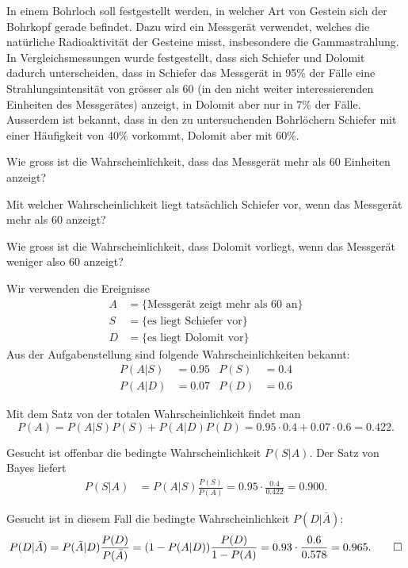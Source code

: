 In einem Bohrloch soll festgestellt werden, in welcher Art von Gestein
sich der Bohrkopf gerade befindet. Dazu wird ein Messgerät verwendet, welches
die natürliche Radioaktivität der Gesteine misst, insbesondere die
Gammastrahlung.
In Vergleichsmessungen wurde festgestellt, dass sich Schiefer
und Dolomit dadurch unterscheiden, dass in Schiefer das Messgerät
in 95\% der Fälle eine Strahlungsintensität von grösser als 60 (in den
nicht weiter interessierenden Einheiten des Messgerätes) anzeigt,
in Dolomit aber nur in 7\% der Fälle.
Ausserdem ist bekannt, dass in den zu untersuchenden Bohrlöchern
Schiefer mit einer Häufigkeit von 40\% vorkommt, Dolomit aber mit 60\%.
\begin{teilaufgaben}
\item
Wie gross ist die Wahrscheinlichkeit, dass das Messgerät mehr als 60
Einheiten anzeigt?
\item
Mit welcher Wahrscheinlichkeit liegt tatsächlich Schiefer vor, wenn 
das Messgerät mehr als 60 anzeigt?
\item
Wie gross ist die Wahrscheinlichkeit, dass Dolomit vorliegt, wenn
das Messgerät weniger also 60 anzeigt?
\end{teilaufgaben}


\begin{loesung}
Wir verwenden die Ereignisse
\begin{align*}
A&=\{\text{Messgerät zeigt mehr als 60 an}\}\\
S&=\{\text{es liegt Schiefer vor}\}\\
D&=\{\text{es liegt Dolomit vor}\}
\end{align*}
Aus der Aufgabenstellung sind folgende Wahrscheinlichkeiten bekannt:
\begin{align*}
P(A|S)&=0.95&
P(S)&=0.4\\
P(A|D)&=0.07&
P(D)&=0.6
\end{align*}
\begin{teilaufgaben}
\item Mit dem Satz von der totalen Wahrscheinlichkeit findet man
\[
P(A)=P(A|S)P(S)+P(A|D)P(D)=0.95\cdot 0.4+0.07\cdot 0.6=0.422.
\]
\item Gesucht ist offenbar die bedingte Wahrscheinlichkeit $P(S|A)$. Der
Satz von Bayes liefert
\begin{align*}
P(S|A)&=P(A|S)\frac{P(S)}{P(A)}=0.95\cdot\frac{0.4}{0.422}=0.900.
\end{align*}
\item
Gesucht ist in diesem Fall die bedingte Wahrscheinlichkeit $P(D|\bar A)$:
\[
P(D|\bar A)=P(\bar A|D)\frac{P(D)}{P(\bar A)}
=(1-P(A|D))\frac{P(D)}{1-P(A)}=0.93 \cdot \frac{0.6}{0.578}=0.965.
\qedhere
\]
\end{teilaufgaben}
\end{loesung}


